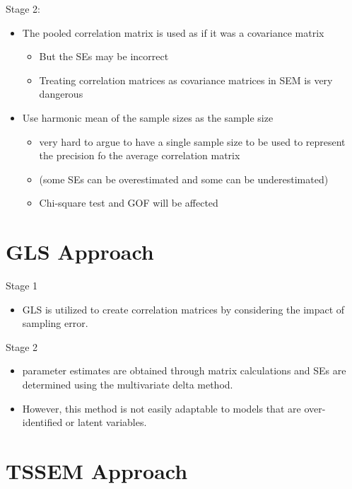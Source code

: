 \documentclass[
]{book}
\providecommand{\tightlist}{%
  \setlength{\itemsep}{0pt}\setlength{\parskip}{0pt}}
\begin{document}
Stage 2:

\begin{itemize}
\item
  The pooled correlation matrix is used as if it was a covariance matrix

  \begin{itemize}
  \item
    But the SEs may be incorrect
  \item
    Treating correlation matrices as covariance matrices in SEM is very dangerous \citep{cudeck1989}
  \end{itemize}
\item
  Use harmonic mean of the sample sizes as the sample size

  \begin{itemize}
  \item
    very hard to argue to have a single sample size to be used to represent the precision fo the average correlation matrix
  \item
    (some SEs can be overestimated and some can be underestimated) \citep{cudeck1989}
  \item
    Chi-square test and GOF will be affected
  \end{itemize}
\end{itemize}

\hypertarget{gls-approach}{%
\section{GLS Approach}\label{gls-approach}}

Stage 1

\begin{itemize}
\tightlist
\item
  GLS is utilized to create correlation matrices by considering the impact of sampling error.
\end{itemize}

Stage 2

\begin{itemize}
\tightlist
\item
  parameter estimates are obtained through matrix calculations and SEs are determined using the multivariate delta method.
\item
  However, this method is not easily adaptable to models that are over-identified or latent variables.
\end{itemize}

\hypertarget{tssem-approach}{%
\section{TSSEM Approach}\label{tssem-approach}}
\end{document}
